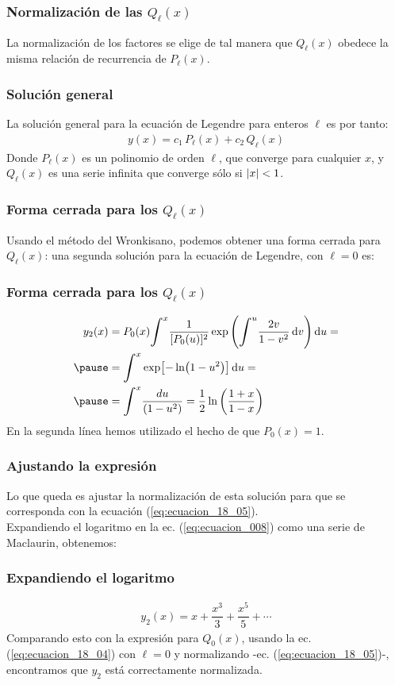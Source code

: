 \documentclass[12pt]{beamer}
\begin{document}
\begin{frame}
\frametitle{Normalización de las $Q_{\ell} (x)$}
La normalización de los factores se elige de tal manera que $Q_{\ell} (x)$ obedece la misma relación de recurrencia de $P_{\ell}(x)$.
\end{frame}
\begin{frame}
\frametitle{Solución general}
La solución general para la ecuación de Legendre para enteros $\ell$ es por tanto:
\pause
\begin{align}
y (x) = c_{1} \, P_{\ell} (x) + c_{2} \, Q_{\ell} (x) 
\label{eq:ecuacion_18_07}
\end{align}
Donde $P_{\ell} (x)$ es un polinomio de orden $\ell$, que converge para cualquier $x$, y $Q_{\ell} (x)$ es una serie infinita que converge sólo si $\abs{x} < 1$.
\end{frame}
\begin{frame}
\frametitle{Forma cerrada para los $Q_{\ell} (x)$}
Usando el método del Wronkisano, podemos obtener una forma cerrada para $Q_{\ell} (x)$: \pause una segunda solución para la ecuación de Legendre, con $\ell = 0$ es:
\end{frame}
\begin{frame}
\frametitle{Forma cerrada para los $Q_{\ell} (x)$}
\begin{eqnarray}
\begin{aligned}
y_{2}(x) &= P_{0}(x) \scaleint{6ex}^{x} \dfrac{1}{[P_{0}(u)]^{2}} \exp \left( \scaleint{6ex}^{u} \dfrac{2v}{1-v^{2}} \dd{v} \right) \dd{u} = \\ \pause
&= \scaleint{6ex}^{x} \exp [ - \ln (1 - u^{2}) ] \dd{u} = \\ \pause
&= \scaleint{6ex}^{x} \dfrac{du}{(1-u^{2})} = \frac{1}{2} \ln \left( \dfrac{1+x}{1-x} \right)
\end{aligned}
\label{eq:ecuacion_008}
\end{eqnarray}
\pause
En la segunda línea hemos utilizado el hecho de que $P_{0} (x) = 1$.
\end{frame}
\begin{frame}
\frametitle{Ajustando la expresión}
Lo que queda es ajustar la normalización de esta solución para que se corresponda con la ecuación (\ref{eq:ecuacion_18_05}).
\\
\bigskip
\pause
Expandiendo el logaritmo en la ec. (\ref{eq:ecuacion_008}) como una serie de Maclaurin, obtenemos:
\end{frame}
\begin{frame}
\frametitle{Expandiendo el logaritmo}
\begin{align*}
y_{2} (x) = x + \dfrac{x^{3}}{3} + \dfrac{x^{5}}{5} + \cdots
\end{align*}
\pause
Comparando esto con la expresión para $Q_{0} (x)$, usando la ec. (\ref{eq:ecuacion_18_04}) con $\ell = 0$ y normalizando -ec. (\ref{eq:ecuacion_18_05})-, encontramos que $y_{2}$ está correctamente normalizada.
\end{frame}
\end{document}
